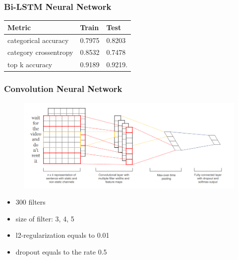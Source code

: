 \documentclass[14pt]{beamer}
\begin{document}
		
		\begin{frame}
			\frametitle{Bi-LSTM Neural Network}
			\begin{table}[h]
				\centering
				\begin{tabular}{| p{4cm} | p{3cm} | p{3cm} |}
					\hline
					\textbf{Metric}  & \textbf{Train} & \textbf{Test}                                                    
					\\ \hline
					categorical accuracy   &  0.7975 & 0.8203
					\\ \hline
					category crossentropy  &  0.8532 & 0.7478
					\\ \hline
					top k accuracy   &  0.9189 & 0.9219.
					\\ \hline		
				\end{tabular}
			\end{table}	
		\end{frame}
		
		
		\begin{frame}
			\frametitle{Convolution Neural Network }
			\begin{figure}[ht] 
				\center
				\includegraphics [scale=0.3] {CNN}
			\end{figure}
			\begin{itemize}
				\item 300 filters
				\item size of filter: 3, 4, 5
				\item l2-regularization equals to 0.01 
				\item dropout equals to the rate 0.5
			\end{itemize}	
		\end{frame}
		
\end{document}
